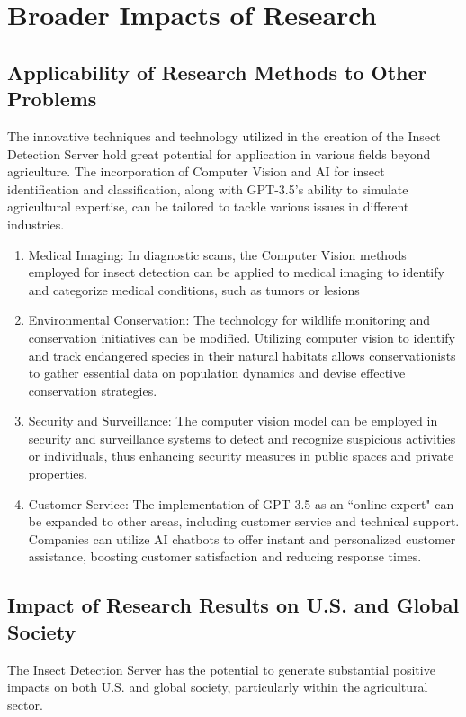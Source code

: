\chapter{Broader Impacts of Research}

\section{Applicability of Research Methods to Other Problems}
The innovative techniques and technology utilized in the creation of the Insect Detection Server hold great potential for application in various fields beyond agriculture. The incorporation of Computer Vision and AI for insect identification and classification, along with GPT-3.5's ability to simulate agricultural expertise, can be tailored to tackle various issues in different industries.

\begin{enumerate}
   \item Medical Imaging: In diagnostic scans, the Computer Vision methods employed for insect detection can be applied to medical imaging to identify and categorize medical conditions, such as tumors or lesions
   \item Environmental Conservation: The technology for wildlife monitoring and conservation initiatives can be modified. Utilizing computer vision to identify and track endangered species in their natural habitats allows conservationists to gather essential data on population dynamics and devise effective conservation strategies.
   \item Security and Surveillance: The computer vision model can be employed in security and surveillance systems to detect and recognize suspicious activities or individuals, thus enhancing security measures in public spaces and private properties.
   \item Customer Service: The implementation of GPT-3.5 as an ``online expert" can be expanded to other areas, including customer service and technical support. Companies can utilize AI chatbots to offer instant and personalized customer assistance, boosting customer satisfaction and reducing response times.
\end{enumerate}

\section{Impact of Research Results on U.S. and Global Society}
The Insect Detection Server has the potential to generate substantial positive impacts on both U.S. and global society, particularly within the agricultural sector.

